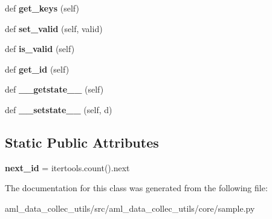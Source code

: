 \begin{DoxyCompactItemize}
def {\bfseries get\+\_\+keys} (self)
\item 
\hypertarget{classaml__data__collec__utils_1_1core_1_1sample_1_1_sample_aa69aa4a4ee2124be1c43614e83f3587d}{}\label{classaml__data__collec__utils_1_1core_1_1sample_1_1_sample_aa69aa4a4ee2124be1c43614e83f3587d} 
def {\bfseries set\+\_\+valid} (self, valid)
\item 
\hypertarget{classaml__data__collec__utils_1_1core_1_1sample_1_1_sample_a44f8357fa4598274e1c05226d488e86c}{}\label{classaml__data__collec__utils_1_1core_1_1sample_1_1_sample_a44f8357fa4598274e1c05226d488e86c} 
def {\bfseries is\+\_\+valid} (self)
\item 
\hypertarget{classaml__data__collec__utils_1_1core_1_1sample_1_1_sample_a216766f78ac3d04c9edfeb853a2d1476}{}\label{classaml__data__collec__utils_1_1core_1_1sample_1_1_sample_a216766f78ac3d04c9edfeb853a2d1476} 
def {\bfseries get\+\_\+id} (self)
\item 
\hypertarget{classaml__data__collec__utils_1_1core_1_1sample_1_1_sample_ab4ff34a96455aa3d79584821f6aeac1f}{}\label{classaml__data__collec__utils_1_1core_1_1sample_1_1_sample_ab4ff34a96455aa3d79584821f6aeac1f} 
def {\bfseries \+\_\+\+\_\+getstate\+\_\+\+\_\+} (self)
\item 
\hypertarget{classaml__data__collec__utils_1_1core_1_1sample_1_1_sample_abd0295a81fe4eb03f5dd9bb2fc4edc17}{}\label{classaml__data__collec__utils_1_1core_1_1sample_1_1_sample_abd0295a81fe4eb03f5dd9bb2fc4edc17} 
def {\bfseries \+\_\+\+\_\+setstate\+\_\+\+\_\+} (self, d)
\end{DoxyCompactItemize}
\subsection*{Static Public Attributes}
\begin{DoxyCompactItemize}
\item 
\hypertarget{classaml__data__collec__utils_1_1core_1_1sample_1_1_sample_a5d2d91c94a40db13e3f16afb5cce323c}{}\label{classaml__data__collec__utils_1_1core_1_1sample_1_1_sample_a5d2d91c94a40db13e3f16afb5cce323c} 
{\bfseries next\+\_\+id} = itertools.\+count().next
\end{DoxyCompactItemize}


The documentation for this class was generated from the following file\+:\begin{DoxyCompactItemize}
\item 
aml\+\_\+data\+\_\+collec\+\_\+utils/src/aml\+\_\+data\+\_\+collec\+\_\+utils/core/sample.\+py\end{DoxyCompactItemize}

